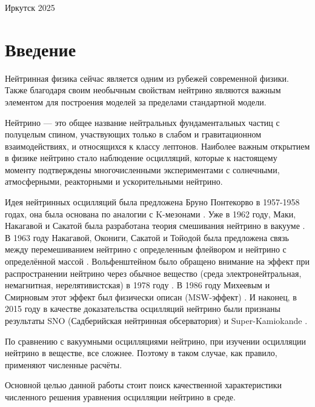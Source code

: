 \documentclass[a4paper,12pt]{article}
\begin{document}
\begin{titlepage}
	\vfill
	\begin{center}
		Иркутск 2025
	\end{center}
\end{titlepage}

\setcounter{page}{2}

\thispagestyle{empty}
\tableofcontents

\newpage

	\section*{Введение}
Нейтринная физика сейчас является одним из рубежей современной физики. Также благодаря своим необычным свойствам нейтрино являются важным элементом для построения моделей за пределами стандартной модели.

Нейтрино --- это общее название нейтральных фундаментальных частиц с полуцелым спином, участвующих только в слабом и гравитационном взаимодействиях, и относящихся к классу лептонов. Наиболее важным открытием в физике нейтрино стало наблюдение осцилляций, которые к настоящему моменту подтверждены многочисленными экспериментами с солнечными, атмосферными, реакторными и ускорительными нейтрино.

Идея нейтринных осцилляций была предложена Бруно Понтекорво в 1957-1958 годах, она была основана по аналогии с K-мезонами \cite{11, 22}. Уже в 1962 году, Маки, Накагавой и Сакатой была разработана теория смешивания нейтрино в вакууме \cite{33}. В 1963 году Накагавой, Окониги, Сакатой и Тойодой была предложена связь между перемешиванием нейтрино с определенным флейвором и нейтрино с определённой массой \cite{44}. Вольфенштейном было обращено внимание на эффект при распространении нейтрино через обычное вещество (среда электронейтральная, немагнитная, нерелятивистская) в 1978 году \cite{55, 66}. В 1986 году Михеевым и Смирновым этот эффект был физически описан (MSW-эффект) \cite{77, 88}. И наконец, в 2015 году в качестве доказательства осцилляций нейтрино были признаны результаты SNO (Садберийская нейтринная обсерватория) \cite{99} и Super-Kamiokande \cite{1010}.

По сравнению с вакуумными осцилляциями нейтрино, при изучении осцилляции нейтрино в веществе, все сложнее. Поэтому в таком случае, как правило, применяют численные расчёты.

Основной целью данной работы стоит поиск качественной характеристики численного решения уравнения осцилляции нейтрино в среде.
\end{document}
